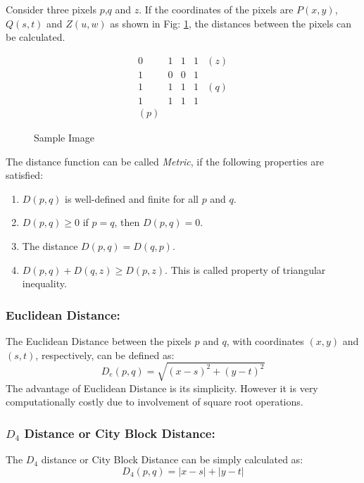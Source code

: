 Consider three pixels $p$,$q$ and $z$.
If the coordinates of the pixels are $P(x,y)$, $Q(s,t)$ and $Z(u,w)$ as shown in Fig: \ref{distanceSample}, the distances between the pixels can be calculated.

\begin{figure}[h]
    \centering

    \begin{equation*}
        \begin{matrix}
        0 & 1 & 1 & 1 & ( z)\\
        1 & 0 & 0 & 1 & \\
        1 & 1 & 1 & 1 & ( q)\\
        1 & 1 & 1 & 1 & \\
        ( p) &  &  &  & 
        \end{matrix}
    \end{equation*}

    \caption{Sample Image}
    \label{distanceSample}
\end{figure}

The distance function can be called \textit{Metric}, if the following properties are satisfied:
\begin{enumerate}
    \item $D(p,q)$ is well-defined and finite for all $p$ and $q$.
    \item $D(p,q) \geqslant 0$ if $p = q$, then $D(p,q)=0$.
    \item The distance $D(p,q) = D(q,p)$.
    \item $D(p,q) + D(q,z) \geqslant D(p,z)$. This is called property of triangular inequality.
\end{enumerate}

\subsubsection{Euclidean Distance:}
The Euclidean Distance between the pixels $p$ and $q$, with coordinates $(x,y)$ and $(s,t)$, respectively, can be defined as:
$$D_e(p,q) = \sqrt{(x-s)^2+(y-t)^2}$$
The advantage of Euclidean Distance is its simplicity.
However it is very computationally costly due to involvement of square root operations.

\subsubsection{$D_4$ Distance or City Block Distance:}
The $D_4$ distance or City Block Distance can be simply calculated as:
$$D_4(p,q) = |x-s| + |y-t|$$


